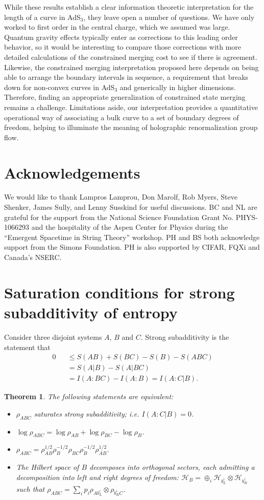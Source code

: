 \documentclass[12pt]{article}
\newtheorem{theorem}{Theorem}[section]
\newcommand{\cH}{\mathcal{H}}
\def\bea{\begin{eqnarray}}
\def\eea{\end{eqnarray}}
\newcommand{\nn}{\nonumber}
\begin{document}
While these results establish a clear information theoretic interpretation for the length of a curve in AdS$_3$, they leave open a number of questions. We have only worked to first order in the central charge, which we assumed was large. Quantum gravity effects typically enter as corrections to this leading order behavior, so it would be interesting to compare those corrections with more detailed calculations of the constrained merging cost to see if there is agreement. Likewise, the constrained merging interpretation proposed here depends on being able to arrange the boundary intervals in sequence, a requirement that breaks down for non-convex curves in AdS$_3$ and generically in higher dimensions. Therefore, finding an appropriate generalization of constrained state merging remains a challenge. Limitations aside, our interpretation provides a quantitative operational way of associating a bulk curve to a set of boundary degrees of freedom, helping to illuminate the meaning of holographic renormalization group flow.


\section*{Acknowledgements}
We would like to thank Lampros Lamprou, Don Marolf, Rob Myers, Steve Shenker, James Sully, and Lenny Susskind for useful discussions. BC and NL are grateful for the support from the National Science Foundation Grant No. PHYS-1066293 and the hospitality of the Aspen Center for Physics during the ``Emergent Spacetime in String Theory'' workshop. PH and BS both acknowledge support from the Simons Foundation. PH is also supported by CIFAR, FQXi and Canada's NSERC.

\appendix
\section{Saturation conditions for strong subadditivity of entropy} \label{ssa-saturation}
 Consider three disjoint systems $A$, $B$ and $C$. Strong subadditivity is the statement that
\bea\label{SSAs}
0&&\leq S(AB)+S(BC)-S(B)-S(ABC)\nn\\
&&=S(A|B)-S(A|BC)\nn\\
&&=I(A:BC)-I(A:B)=I(A:C|B).
\eea

\begin{theorem}
The following statements are equivalent: \cite{lieb-ruskai,hayden2004structure,ruskai}
\begin{itemize}
\item $\rho_{ABC}$ saturates strong subadditivity; i.e. $I(A:C|B)=0$.
\item $\log\rho_{ABC}=\log\rho_{AB}+\log\rho_{BC}-\log\rho_B$.
\item $\rho_{ABC}=\rho_{AB}^{1/2}\rho_B^{-1/2}\rho_{BC}\rho_B^{-1/2}\rho_{AB}^{1/2}$.
\item The Hilbert space of $B$ decomposes into orthogonal sectors, each admitting a decomposition into left and right degrees of freedom: $\cH_B=\oplus_i \cH_{b_L^i}\otimes \cH_{b_R^i}$ such that $\rho_{ABC}=\sum_ip_i\rho_{Ab_L^i}\otimes\rho_{b_R^iC}$.
\end{itemize}
\end{theorem}
\end{document}
